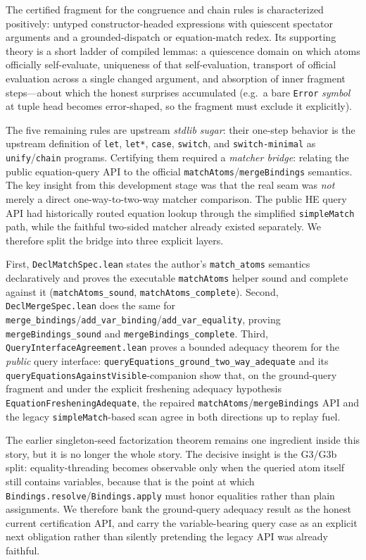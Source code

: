 \documentclass[11pt]{article}
\newcommand{\code}[1]{\texttt{#1}}
\newcommand{\HE}{\textup{HE}}
\begin{document}
The certified fragment for the congruence and chain rules is
characterized positively: untyped constructor-headed expressions with
quiescent spectator arguments and a grounded-dispatch or
equation-match redex.  Its supporting theory is a short ladder of
compiled lemmas: a quiescence domain on which atoms officially
self-evaluate, uniqueness of that self-evaluation, transport of
official evaluation across a single changed argument, and absorption
of inner fragment steps---about which the honest surprises accumulated
(e.g.\ a bare \code{Error} \emph{symbol} at tuple head becomes
error-shaped, so the fragment must exclude it explicitly).

The five remaining rules are upstream \emph{stdlib sugar}: their
one-step behavior is the upstream definition of \code{let},
\code{let*}, \code{case}, \code{switch}, and \code{switch-minimal} as
\code{unify}/\code{chain} programs.  Certifying them required a
\emph{matcher bridge}: relating the public equation-query API to the
official \code{matchAtoms}/\code{mergeBindings} semantics.  The key
insight from this development stage was that the real seam was \emph{not} merely a
direct one-way-to-two-way matcher comparison.  The public \HE{} query
API had historically routed equation lookup through the simplified
\code{simpleMatch} path, while the faithful two-sided matcher already
existed separately.  We therefore split the bridge into three explicit
layers.

First, \code{DeclMatchSpec.lean} states the author's
\code{match\_atoms} semantics declaratively and proves the executable
\code{matchAtoms} helper sound and complete against it
(\code{matchAtoms\_sound}, \code{matchAtoms\_complete}).  Second,
\code{DeclMergeSpec.lean} does the same for
\code{merge\_bindings}/\code{add\_var\_binding}/\code{add\_var\_equality},
proving \code{mergeBindings\_sound} and
\code{mergeBindings\_complete}.  Third,
\code{QueryInterfaceAgreement.lean} proves a bounded adequacy theorem for
the \emph{public} query interface:
\code{queryEquations\_ground\_two\_way\_adequate} and its
\code{queryEquationsAgainstVisible}-companion show that, on the
ground-query fragment and under the explicit freshening adequacy
hypothesis \code{EquationFresheningAdequate}, the repaired
\code{matchAtoms}/\code{mergeBindings} API and the legacy
\code{simpleMatch}-based scan agree in both directions up to replay
fuel.

The earlier singleton-seed factorization theorem remains one ingredient
inside this story, but it is no longer the whole story.  The decisive
insight is the G3/G3b split: equality-threading becomes observable only
when the queried atom itself still contains variables, because that is
the point at which \code{Bindings.resolve}/\code{Bindings.apply} must
honor equalities rather than plain assignments.  We therefore bank the
ground-query adequacy result as the honest current certification
API, and carry the variable-bearing query case as an explicit next
obligation rather than silently pretending the legacy API was already
faithful.
\end{document}
